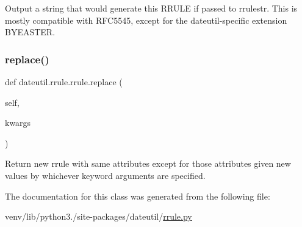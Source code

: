 \begin{DoxyVerb}Output a string that would generate this RRULE if passed to rrulestr.
This is mostly compatible with RFC5545, except for the
dateutil-specific extension BYEASTER.
\end{DoxyVerb}
 \mbox{\label{classdateutil_1_1rrule_1_1rrule_af880b2b4a2287910e2488f8690f65268}} 
\subsubsection{\texorpdfstring{replace()}{replace()}}
{\footnotesize\ttfamily def dateutil.\+rrule.\+rrule.\+replace (\begin{DoxyParamCaption}\item[{}]{self,  }\item[{}]{kwargs }\end{DoxyParamCaption})}

\begin{DoxyVerb}Return new rrule with same attributes except for those attributes given new
   values by whichever keyword arguments are specified.\end{DoxyVerb}
 

The documentation for this class was generated from the following file\+:\begin{DoxyCompactItemize}
\item 
venv/lib/python3./site-\/packages/dateutil/\hyperlink{rrule_8py}{rrule.\+py}\end{DoxyCompactItemize}
